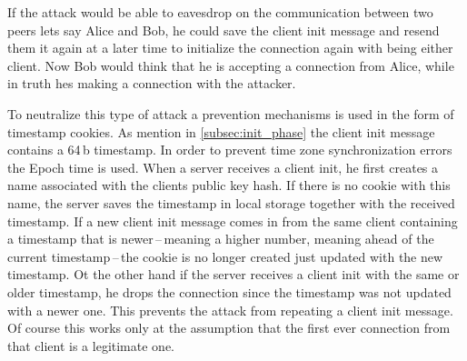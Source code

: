 If the attack would be able to eavesdrop on the communication between two peers lets say Alice and Bob, he could save the client init message and resend them it again at a later time to initialize the connection again with being either client. Now Bob would think that he is accepting a connection from Alice, while in truth hes making a connection with the attacker.

To neutralize this type of attack a prevention mechanisms is used in the form of timestamp cookies. As mention in \ref{subsec:init_phase} the client init message contains a 64\,b timestamp. In order to prevent time zone synchronization errors the Epoch time is used. When a server receives a client init, he first creates a name associated with the clients public key hash. If there is no cookie with this name, the server saves the timestamp in local storage together with the received timestamp. If a new client init message comes in from the same client containing a timestamp that is newer\,--\,meaning a higher number, meaning ahead of the current timestamp\,--\,the cookie is no longer created just updated with the new timestamp. Ot the other hand if the server receives a client init with the same or older timestamp, he drops the connection since the timestamp was not updated with a newer one. This prevents the attack from repeating a client init message. Of course this works only at the assumption that the first ever connection from that client is a legitimate one.
